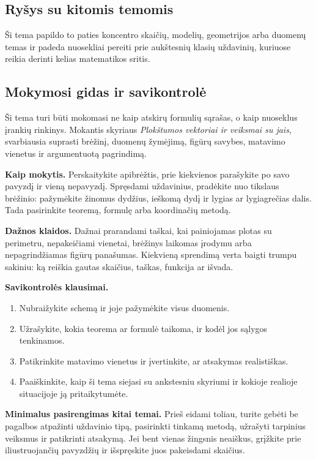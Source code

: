 \subsection{Ryšys su kitomis temomis}
Ši tema papildo to paties koncentro skaičių, modelių, geometrijos arba duomenų temas ir padeda nuosekliai pereiti prie aukštesnių klasių uždavinių, kuriuose reikia derinti kelias matematikos sritis.

\subsection{Mokymosi gidas ir savikontrolė}

Ši tema turi būti mokomasi ne kaip atskirų formulių sąrašas, o kaip nuoseklus įrankių rinkinys. Mokantis skyriaus \textit{Plokštumos vektoriai ir veiksmai su jais}, svarbiausia suprasti brėžinį, duomenų žymėjimą, figūrų savybes, matavimo vienetus ir argumentuotą pagrindimą.

\textbf{Kaip mokytis.} Perskaitykite apibrėžtis, prie kiekvienos parašykite po savo pavyzdį ir vieną nepavyzdį. Spręsdami uždavinius, pradėkite nuo tikslaus brėžinio: pažymėkite žinomus dydžius, ieškomą dydį ir lygias ar lygiagrečias dalis. Tada pasirinkite teoremą, formulę arba koordinačių metodą.

\textbf{Dažnos klaidos.} Dažnai prarandami taškai, kai painiojamas plotas su perimetru, nepakeičiami vienetai, brėžinys laikomas įrodymu arba nepagrindžiamas figūrų panašumas. Kiekvieną sprendimą verta baigti trumpu sakiniu: ką reiškia gautas skaičius, taškas, funkcija ar išvada.

\textbf{Savikontrolės klausimai.}
\begin{enumerate}[label=\arabic*.]
\item Nubraižykite schemą ir joje pažymėkite visus duomenis.
\item Užrašykite, kokia teorema ar formulė taikoma, ir kodėl jos sąlygos tenkinamos.
\item Patikrinkite matavimo vienetus ir įvertinkite, ar atsakymas realistiškas.
\item Paaiškinkite, kaip ši tema siejasi su ankstesniu skyriumi ir kokioje realioje situacijoje ją pritaikytumėte.
\end{enumerate}

\textbf{Minimalus pasirengimas kitai temai.} Prieš eidami toliau, turite gebėti be pagalbos atpažinti uždavinio tipą, pasirinkti tinkamą metodą, užrašyti tarpinius veiksmus ir patikrinti atsakymą. Jei bent vienas žingsnis neaiškus, grįžkite prie iliustruojančių pavyzdžių ir išspręskite juos pakeisdami skaičius.

